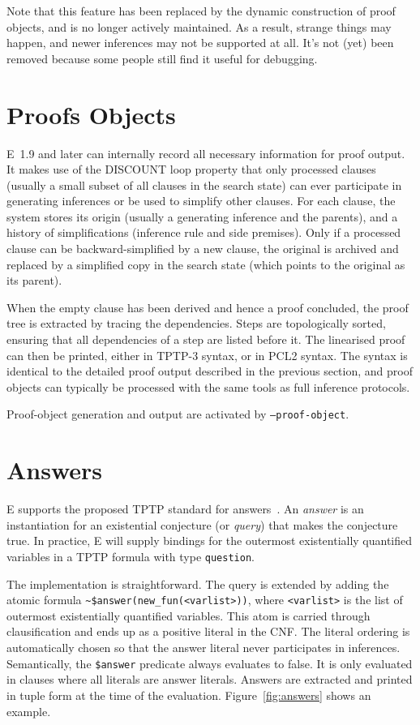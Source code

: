 \documentclass{report}
\begin{document}
Note that this feature has been replaced by the dynamic construction
of proof objects, and is no longer actively maintained. As a result,
strange things may happen, and newer inferences may not be supported
at all. It's not (yet) been removed because some people still find it
useful for debugging.

\section{Proofs Objects}


E~1.9 and later can internally record all necessary information for
proof output. It makes use of the DISCOUNT loop property that only
processed clauses (usually a small subset of all clauses in the search
state) can ever participate in generating inferences or be used to
simplify other clauses. For each clause, the system stores its origin
(usually a generating inference and the parents), and a history of
simplifications (inference rule and side premises). Only if a
processed clause can be backward-simplified by a new clause, the
original is archived and replaced by a simplified copy in the search
state (which points to the original as its parent).

When the empty clause has been derived and hence a proof concluded,
the proof tree is extracted by tracing the dependencies. Steps are
topologically sorted, ensuring that all dependencies of a step are
listed before it. The linearised proof can then be printed, either in
TPTP-3 syntax, or in PCL2 syntax. The syntax is identical to the
detailed proof output described in the previous section, and proof
objects can typically be processed with the same tools as full
inference protocols.

Proof-object generation and output are activated by
\texttt{--proof-object}.


\section{Answers}

E supports the proposed TPTP standard for
answers~\cite{SSSU:TPTP-ANS}. An \emph{answer} is an instantiation for
an existential conjecture (or \emph{query}) that makes the conjecture
true. In practice, E will supply bindings for the outermost
existentially quantified variables in a TPTP formula with type
\texttt{question}.

The implementation is straightforward. The query is extended by adding
the atomic formula \verb|~$answer(new_fun(<varlist>))|, where
\verb|<varlist>| is the list of outermost existentially quantified
variables. This atom is carried through clausification and ends up as
a positive literal in the CNF. The literal ordering is automatically
chosen so that the answer literal never participates in
inferences. Semantically, the \verb|$answer| predicate always
evaluates to false. It is only evaluated in clauses where all literals
are answer literals. Answers are extracted and printed in tuple form
at the time of the evaluation. Figure~\ref{fig:answers} shows an
example.
\end{document}
